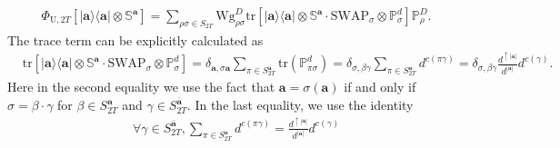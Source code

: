 \documentclass[aps,%
twocolumn,%
floatfix,%
pra,%
amsfonts,%
groupedaddress,%
superscriptaddress]{revtex4-2}%
\newcommand{\bra}[1]{\langle #1\rvert}
\newcommand{\ket}[1]{\lvert #1\rangle}
\newcommand{\1}{\mathbbm{1}}
\begin{document}
\begin{align}
    \Phi_{\mathrm{U},2T}\left[ \ket{{\mathbf{a}}}\!\bra{{\mathbf{a}}}\otimes\mathbb{S}^{\mathbf{a}}\right] = \sum_{\rho \sigma \in S_{2T}} \mathrm{Wg}_{\rho\sigma}^{D} \mathrm{tr}\left[\ket{{\mathbf{a}}}\!\bra{{\mathbf{a}}}\otimes\mathbb{S}^{\mathbf{a}} \cdot \mathrm{SWAP}_{\sigma} \otimes \mathbb{P}_{\sigma}^{d}\right] \mathbb{P}_{\rho}^{D}.
\end{align}
The trace term can be explicitly calculated as
\begin{align}
    &\mathrm{tr}\left[\ket{{\mathbf{a}}}\!\bra{{\mathbf{a}}}\otimes\mathbb{S}^{\mathbf{a}} \cdot \mathrm{SWAP}_{\sigma} \otimes \mathbb{P}_{\sigma}^{d}\right]= \delta_{\mathbf{a}, \sigma{\mathbf{a}}} \sum_{\pi \in S_{2T}^{\mathbf{a}}} \mathrm{tr}\left(\mathbb{P}_{\pi \sigma}^{d}\right) = \delta_{\sigma, \beta \gamma} \sum_{\pi \in S_{2T}^{{\mathbf{a}}}} d^{c(\pi\gamma)} = \delta_{\sigma, \beta \gamma} \frac{d^{\uparrow |\mathbf{a}|}}{d^{|{\mathbf{a}}|}}d^{c(\gamma)}.
\end{align}
Here in the second equality we use the fact that $\mathbf{a} = \sigma(\mathbf{a})$ if and only if  $\sigma = \beta \cdot \gamma$ for $\beta\in S_{2T}^{\mathbf{a}}$ and $\gamma \in S_{2T}^{\bar{\mathbf{a}}}$. In the last equality, we use the identity 
\begin{align}
   \forall \gamma \in S_{2T}^{\bar{\mathbf{a}}}, \sum_{\pi\in S_{2T}^{\mathbf{a}}} d^{c(\pi\gamma )} =  \frac{d^{\uparrow |\mathbf{a}|}}{d^{|{\mathbf{a}}|}}d^{c(\gamma)}
\end{align}
\end{document}
